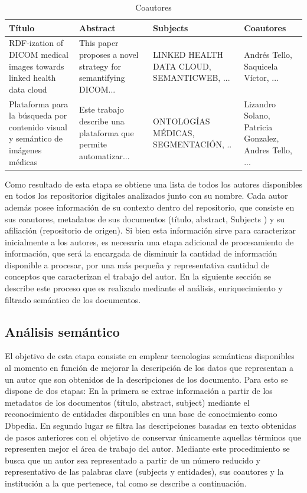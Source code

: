 \documentclass[conference]{IEEEtran}
\begin{document}
\begin{table}[]
\centering
\caption{Coautores}
\label{tb:coautores}
\begin{tabular}{@{}p{}p{}p{}p{}@{}}
\toprule
Título                                                                           & Abstract                                                        & Subjects                                   & Coautores                                             \\ \midrule
RDF-ization of DICOM medical images towards linked health data cloud             & This paper proposes a novel strategy for semantifying DICOM...  & LINKED HEALTH DATA CLOUD, SEMANTICWEB, ... & Andrés Tello, Saquicela Víctor, ...                   \\
Plataforma para la búsqueda por contenido visual y semántico de imágenes médicas & Este trabajo describe una plataforma que permite automatizar... & ONTOLOGÍAS MÉDICAS, SEGMENTACIÓN, ..       & Lizandro Solano, Patricia Gonzalez, Andres Tello, ... \\ \bottomrule
\end{tabular}
\end{table}

Como resultado de esta etapa se obtiene una lista de todos los autores disponibles en todos los repositorios digitales analizados junto con su nombre. Cada autor además posee información de su contexto dentro del repositorio, que consiste en sus coautores, metadatos de sus documentos (título, abstract, Subjects ) y su afiliación (repositorio de origen). Si bien esta información sirve para caracterizar inicialmente a los autores, es necesaria una etapa adicional de procesamiento de información, que será la encargada de disminuir la cantidad de información disponible a procesar,  por una más  pequeña y representativa cantidad de conceptos que caracterizan el trabajo del autor. En la siguiente sección se describe este proceso que es realizado mediante  el análisis, enriquecimiento y filtrado semántico de los documentos.

\subsection{Análisis semántico}

El objetivo de esta etapa consiste en emplear tecnologias semánticas disponibles al momento en función de mejorar la descripción de los datos que representan a un  autor que son obtenidos de la descripciones de los documento.  Para esto se dispone de dos etapas: En la primera se extrae información a partir de los metadatos de los documentos (título, abstract, subject) mediante el reconocimiento de entidades disponibles en una base de conocimiento como Dbpedia. En segundo lugar se filtra las descripciones basadas en texto obtenidas de pasos anteriores con el objetivo de conservar únicamente aquellas términos que representen mejor el área de trabajo del autor.  Mediante este procedimiento se busca que un autor sea representado  a partir de un número reducido y representativo de las palabras clave (subjects y entidades), sus coautores y la institución a la que pertenece, tal como se describe a continuación. 
\end{document}
